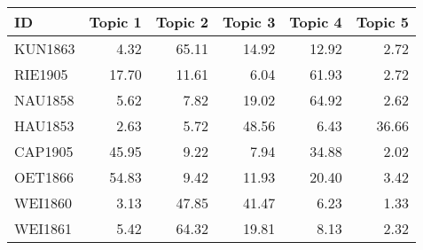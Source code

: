 \begin{tabular}{lrrrrr}
\toprule
     ID &  Topic 1 &  Topic 2 &  Topic 3 &  Topic 4 &  Topic 5 \\
\midrule
KUN1863 &     4.32 &    65.11 &    14.92 &    12.92 &     2.72 \\
RIE1905 &    17.70 &    11.61 &     6.04 &    61.93 &     2.72 \\
NAU1858 &     5.62 &     7.82 &    19.02 &    64.92 &     2.62 \\
HAU1853 &     2.63 &     5.72 &    48.56 &     6.43 &    36.66 \\
CAP1905 &    45.95 &     9.22 &     7.94 &    34.88 &     2.02 \\
OET1866 &    54.83 &     9.42 &    11.93 &    20.40 &     3.42 \\
WEI1860 &     3.13 &    47.85 &    41.47 &     6.23 &     1.33 \\
WEI1861 &     5.42 &    64.32 &    19.81 &     8.13 &     2.32 \\
\bottomrule
\end{tabular}
